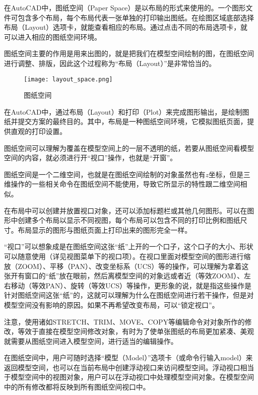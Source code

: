 在AutoCAD中，图纸空间（Paper Space）是以布局的形式来使用的。一个图形文件可包含多个布局，每个布局代表一张单独的打印输出图纸。在绘图区域底部选择布局（Layout）选项卡，就能查看相应的布局。通过点击不同的布局选项卡，就可以进入相应的图纸空间环境。

图纸空间主要的作用是用来出图的，就是把我们在模型空间绘制的图，在图纸空间进行调整、排版，因此这个过程称为“布局（Layout）”是非常恰当的。


\begin{figure}[htbp]
\centering
\texttt{[image: layout\_space.png]}
\caption{图纸空间}
\end{figure}


在AutoCAD中，通过布局（Layout）和打印（Plot）来完成图形输出，是绘制图纸并提交方案的最终目的。其中，布局是一种图纸空间环境，它模拟图纸页面，提供直观的打印设置。

图纸空间可以理解为覆盖在模型空间上的一层不透明的纸，若要从图纸空间看模型空间的内容，就必须进行开“视口”操作，也就是“开窗”。

图纸空间是一个二维空间，也就是在图纸空间绘制的对象虽然也有$z$坐标，但是三维操作的一些相关命令在图纸空间不能使用，导致它所显示的特性跟二维空间相似。


在布局中可以创建并放置视口对象，还可以添加标题栏或其他几何图形。可以在图形中创建多个布局以显示不同视图，每个布局可以包含不同的打印比例和图纸尺寸。布局显示的图形与图纸页面上打印出来的图形完全一样。

“视口”可以想象成是在图纸空间这张“纸”上开的一个口子，这个口子的大小、形状可以随意使用（详见视图菜单下的视口项）。在视口里面对模型空间的图形进行缩放（ZOOM）、平移（PAN）、改变坐标系（UCS）等的操作，可以理解为拿着这张开有窗口的“纸”放在眼前，然后离模型空间的对象远或者近（等效ZOOM）、左右移动（等效PAN）、旋转（等效UCS）等操作，更形象的说，就是指这些操作是针对图纸空间这张“纸”的，这就可以理解为什么在图纸空间进行若干操作，但是对模型空间没有影响的原因。如果不再希望改变布局，可以“锁定视口”。

注意，使用诸如STRETCH、TRIM、MOVE、COPY等编辑命令对对象所作的修改，等效于直接在模型空间修改对象，有时为了使单张图纸的布局更加紧凑、美观就需要从图纸空间进入模型空间，进行适当的编辑操作。 


在图纸空间中，用户可随时选择“模型（Model）”选项卡（或命令行输入model）来返回模型空间，也可以在当前布局中创建浮动视口来访问模型空间。浮动视口相当于模型空间中的视图对象，用户可以在浮动视口中处理模型空间对象。在模型空间中的所有修改都将反映到所有图纸空间视口中。

